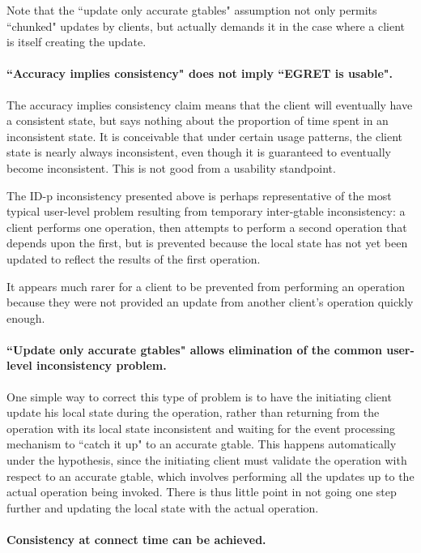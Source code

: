 Note that the ``update only accurate gtables" assumption not only
permits ``chunked" updates by clients, but actually demands it in the 
case where a client is itself creating the update. 


\paragraph{ ``Accuracy implies consistency" does not imply ``EGRET is usable".}

The accuracy implies consistency claim means that the client will 
eventually have a consistent state, but says nothing about the 
proportion of time spent in an inconsistent state.  It is conceivable 
that under certain usage patterns, the client state is nearly always 
inconsistent, even though it is guaranteed to eventually become 
inconsistent.  This is not good from a usability standpoint. 

The ID-p inconsistency presented above is perhaps representative of
the most typical user-level problem resulting from temporary
inter-gtable inconsistency: a client performs one operation, then 
attempts to perform a second operation that depends upon the first,
but is prevented because the local state has not yet been updated
to reflect the results of the first operation.

It appears much rarer for a client to be prevented from performing an
operation because they were not provided an update from another
client's operation quickly enough.

\paragraph{ ``Update only accurate gtables" allows elimination of the
common user-level inconsistency problem.}

One simple way to correct this type of problem is to have the
initiating client update his local state during the operation, rather
than returning from the operation with its local state inconsistent
and waiting for the event processing mechanism to ``catch it up" to an
accurate gtable. This happens automatically under the hypothesis,
since the initiating client must validate the operation with respect
to an accurate gtable, which involves performing all the updates up to
the actual operation being invoked.  There is thus little point in not
going one step further and updating the local state with the actual
operation.

\paragraph {Consistency at connect time can be achieved.}

